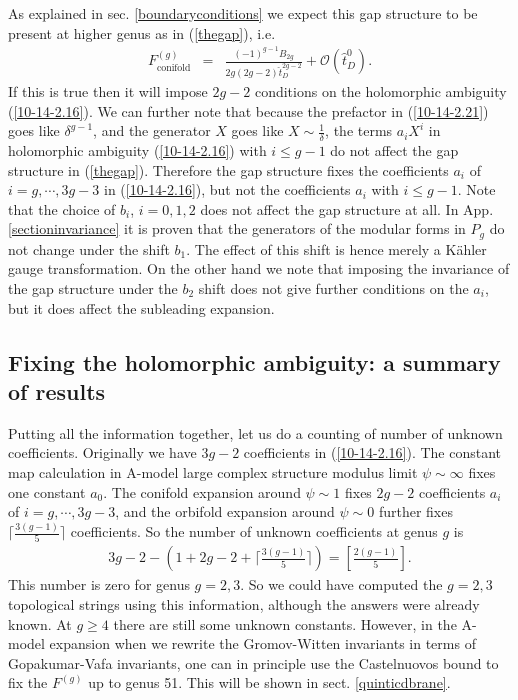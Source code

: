 \documentclass[12pt]{article}
\begin{document}
As explained in sec. \ref{boundaryconditions} we expect this gap structure
to be present at higher genus as in (\ref{thegap}), i.e.
\begin{eqnarray}
F^{(g)}_{\textrm{conifold}}&=&\frac{(-1)^{g-1}B_{2g}}{2g(2g-2)\hat t_D^{2g-2}}+\mathcal{O}(\hat t_D^0).
\end{eqnarray}
If this is true then it will impose $2g-2$ conditions on the
holomorphic ambiguity (\ref{10-14-2.16}). We can further note that
because the prefactor in (\ref{10-14-2.21}) goes like
$\delta^{g-1}$, and the generator $X$ goes like $X\sim
\frac{1}{\delta}$, the terms $a_iX^i$ in holomorphic ambiguity
(\ref{10-14-2.16}) with $i\leq g-1$ do not affect the gap
structure in (\ref{thegap}). Therefore the gap structure fixes the
coefficients $a_i$ of $i=g, \cdots, 3g-3 $ in (\ref{10-14-2.16}),
but not the coefficients $a_i$ with $i\leq g-1$. 
Note that the choice of $b_i$, $i=0,1,2$ does not  affect the gap structure 
at all.  In App. \ref{sectioninvariance} it is proven that the generators 
of the modular forms in $P_g$ do not change under the shift $b_1$. 
The effect of this shift is hence merely a K\"ahler gauge 
transformation.   On the other hand we note that imposing the 
invariance of the gap structure under the $b_2$ shift does not 
give further conditions on the $a_i$, but it does affect 
the subleading expansion.





\subsection{Fixing the holomorphic ambiguity: a summary of results}

Putting all the information together, let us do a counting of
number of unknown coefficients. Originally we have $3g-2$
coefficients in (\ref{10-14-2.16}). The constant map calculation
\cite{Marino:1998, GVI, FP} in A-model large complex structure
modulus limit $\psi\sim \infty$ fixes one constant $a_0$. The
conifold expansion around $\psi\sim 1$ fixes $2g-2$ coefficients
$a_i$ of $i=g, \cdots, 3g-3$, and the orbifold expansion around
$\psi\sim 0$ further fixes $\lceil\frac{3(g-1)}{5}\rceil$
coefficients. So the number of unknown coefficients at genus $g$
is
\begin{eqnarray}
3g-2-(1+2g-2+\lceil\frac{3(g-1)}{5}\rceil)=[\frac{2(g-1)}{5}].
\label{boundarycountquintic}
\end{eqnarray}
This number is zero for genus $g=2,3$. So we could have computed
the $g=2,3$ topological strings using this information, although
the answers were already known. At $g\geq 4$ there are still
some unknown constants. However, in the A-model expansion when we
rewrite the Gromov-Witten invariants in terms of Gopakumar-Vafa
invariants, one can in principle use the Castelnuovos bound to fix
the $F^{(g)}$ up to genus 51. This will be shown in sect.
\ref{quinticdbrane}.
\end{document}
